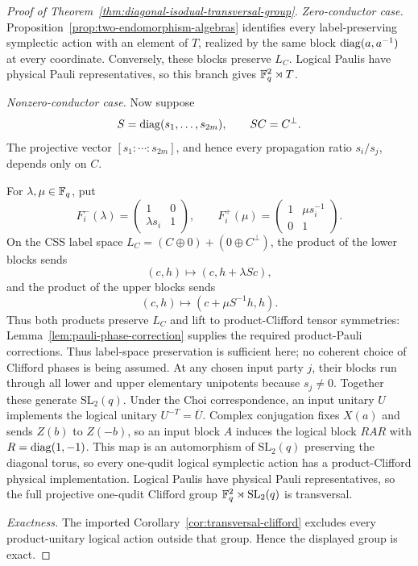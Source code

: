 \begin{proof}[Proof of
Theorem~\ref{thm:diagonal-isodual-transversal-group}]

\medskip\noindent\emph{Zero-conductor case.}
Proposition~\ref{prop:two-endomorphism-algebras} identifies every
label-preserving symplectic action with an element of \(T\), realized by the
same block \(\operatorname{diag}(a,a^{-1})\) at every coordinate.  Conversely, these blocks
preserve \(L_C\).  Logical Paulis have physical Pauli representatives, so this
branch gives \(\mathbb F_q^2\rtimes T\).

\medskip\noindent\emph{Nonzero-conductor case.}
Now suppose
\begin{equation}\label{eq:diagonal-duality-witness}
 S=\operatorname{diag}(s_1,\ldots,s_{2m}),\qquad SC=C^\perp .
\end{equation}
The projective vector \([s_1:\cdots:s_{2m}]\), and hence every propagation
ratio \(s_i/s_j\), depends only on \(C\).

For \(\lambda,\mu\in\mathbb F_q\), put
\begin{equation}\label{eq:duality-shears}
 F_i^-(\lambda)=
 \begin{pmatrix}1&0\\ \lambda s_i&1\end{pmatrix},
 \qquad
 F_i^+(\mu)=
 \begin{pmatrix}1&\mu s_i^{-1}\\0&1\end{pmatrix}.
\end{equation}
On the CSS label space
\(L_C=(C\oplus0)+(0\oplus C^\perp)\), the product of the lower blocks
sends
\[
 (c,h)\longmapsto(c,h+\lambda Sc),
\]
and the product of the upper blocks sends
\[
 (c,h)\longmapsto(c+\mu S^{-1}h,h).
\]
Thus both products preserve \(L_C\) and lift to product-Clifford tensor
symmetries: Lemma~\ref{lem:pauli-phase-correction} supplies the required
product-Pauli corrections.  Thus label-space preservation is sufficient
here; no coherent choice of Clifford phases is being assumed.
At any chosen input party \(j\), their blocks run through all lower and
upper elementary unipotents because \(s_j\ne0\).  Together these generate
\(\mathrm{SL}_2(q)\).  Under the Choi correspondence, an input unitary
\(U\) implements the logical unitary \(U^{-T}=\overline{U}\).  Complex
conjugation fixes \(X(a)\) and sends \(Z(b)\) to \(Z(-b)\), so an input
block \(A\) induces the logical block \(RAR\) with \(R=\operatorname{diag}(1,-1)\).
This map is an automorphism of \(\mathrm{SL}_2(q)\) preserving the
diagonal torus, so every one-qudit logical symplectic action has a
product-Clifford physical implementation.  Logical Paulis have
physical Pauli representatives, so the full projective one-qudit
Clifford group
\(\mathbb F_q^2\rtimes\mathrm{SL}_2(q)\) is transversal.

\medskip\noindent\emph{Exactness.}
The imported Corollary~\ref{cor:transversal-clifford} excludes every product-unitary
logical action outside that group.  Hence the displayed group is exact.
\end{proof}

